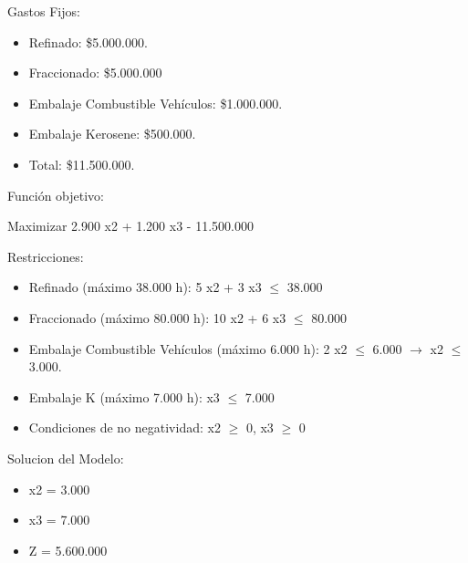 \documentclass[10pt,a4paper]{article}
\begin{document}
\begin{enumerate}
    Gastos Fijos:

    \begin{itemize}

        \item Refinado: \$5.000.000.
        \item Fraccionado: \$5.000.000
        \item Embalaje Combustible Vehículos: \$1.000.000.
        \item Embalaje Kerosene: \$500.000.
        \item Total: \$11.500.000. \\

    \end{itemize}


    Función objetivo: 

    \begin{center}
        
        Maximizar 2.900 x2 + 1.200 x3 - 11.500.000

    \end{center}


    Restricciones: 

    \begin{itemize}

        \item Refinado (máximo 38.000 h):  5 x2 + 3 x3 $\leq$ 38.000
        \item Fraccionado (máximo 80.000 h): 10 x2 + 6 x3 $\leq$ 80.000
        \item Embalaje Combustible Vehículos (máximo 6.000 h): 2 x2 $\leq$ 6.000 $\rightarrow$ x2 $\leq$ 3.000.
        \item Embalaje K (máximo 7.000 h): x3 $\leq$ 7.000
        \item Condiciones de no negatividad: x2  $\geq$ 0, x3 $\geq$ 0\\

    \end{itemize}

    \vspace{0.5em}

    Solucion del Modelo: 

    \begin{itemize}

        \item x2 = 3.000
        \item x3 = 7.000
        \item Z = 5.600.000\\

    \end{itemize}


\end{enumerate}
\end{document}
